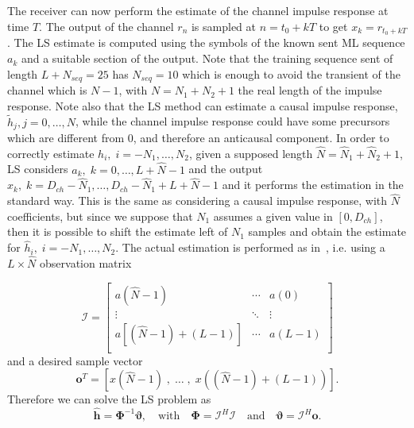 \documentclass[10pt]{article}
\begin{document}
The receiver can now perform the estimate of the channel impulse response at time $T$. The output of the channel $r_n$ is sampled at $n = t_0 + kT$ to get $x_k = r_{t_0 + kT}$. The LS estimate is computed using the symbols of the known sent ML sequence $a_k$ and a suitable section of the output. Note that the training sequence sent of length $L + N_{seq} = 25$ has $N_{seq} = 10$ which is enough to avoid the transient of the channel which is $N - 1$, with $N = N_1 + N_2 + 1$ the real length of the impulse response.
Note also that the LS method can estimate a causal impulse response, $\tilde{h}_j, j = 0, \dots, N$, while the channel impulse response could have some precursors which are different from 0, and therefore an anticausal component. In order to correctly estimate $h_i, \; i = -N_1, \dots, N_2$, given a supposed length $\hat{N} = \hat{N}_1 + \hat{N}_2 + 1$, LS considers $a_k, \; k = 0, \dots, L+\hat{N}-1$ and the output $x_k, \; k = D_{ch} - \hat{N}_1, \dots, D_{ch} - \hat{N}_1 + L + \hat{N} - 1$ and it performs the estimation in the standard way. This is the same as considering a causal impulse response, with $\hat{N}$ coefficients, but since we suppose that $N_1$ assumes a given value in $[0, D_{ch}]$, then it is possible to shift the estimate left of $N_1$ samples and obtain the estimate for $\hat{h}_i, \; i = -N_1, \dots, N_2$. 
The actual estimation is performed as in~\cite[p.~246]{bc}, i.e. using a $L \times \hat{N}$ observation matrix

\begin{equation}
	\boldsymbol{\mathcal{I}} =
 \begin{bmatrix}
  a(\hat{N}-1) & \cdots & a(0) \\
  \vdots  & \ddots & \vdots  \\
a[(\hat{N}-1)+(L-1)] & \cdots & a(L-1) \\
 \end{bmatrix}
\end{equation}
and a desired sample vector
\begin{equation}
\mathbf{o}^T = \left[ x(\hat{N}-1)\;,\; \ldots\; , \;x((\hat{N}-1)+(L-1)) \right].
\end{equation}
Therefore we can solve the LS problem as
\begin{equation}
	\hat{\mathbf{h}}= \mathbf{\Phi}^{-1} \boldsymbol{\vartheta}, \quad\mathrm{ with } \quad \mathbf{\Phi}=\boldsymbol{\mathcal{I}}^H \boldsymbol{\mathcal{I}} \quad \mathrm{ and }\quad \boldsymbol{\vartheta} = \boldsymbol{\mathcal{I}}^H \mathbf{o}.
\end{equation}
\end{document}
